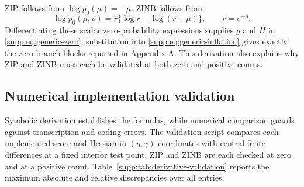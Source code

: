\documentclass[a4paper,fleqn]{cas-sc}
\numberwithin{equation}{section}
\begin{document}
ZIP follows from $\log p_0(\mu)=-\mu$. ZINB follows from
\[
 \log p_0(\mu,\rho)
 =r\{\log r-\log(r+\mu)\},\qquad r=e^{-\rho}.
\]
Differentiating these scalar zero-probability expressions supplies $g$ and $H$ in \eqref{supp:eq:generic-zero}; substitution into
\eqref{supp:eq:generic-inflation} gives exactly the zero-branch blocks reported in Appendix A. This derivation also explains why ZIP and ZINB must each be validated at both zero and positive counts.

\subsection{Numerical implementation validation}

Symbolic derivation establishes the formulas, while numerical comparison guards against transcription and coding errors. The validation script compares each implemented score and Hessian in $(\eta,\gamma)$ coordinates with central finite differences at a fixed interior test point. ZIP and ZINB are each checked at zero and at a positive count. Table~\ref{supp:tab:derivative-validation} reports the maximum absolute and relative discrepancies over all entries.
\end{document}
